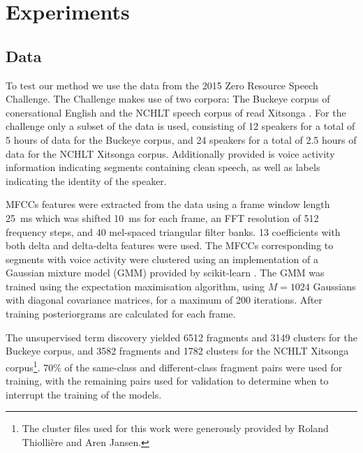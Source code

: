 \section{Experiments}
\label{sec:experiments}

\subsection{Data}
\label{sec:data}

To test our method we use the data from the 2015 Zero Resource Speech Challenge.
The Challenge makes use of two corpora: The Buckeye corpus of conersational English \parencite{buckeyecorpus} and the NCHLT speech corpus of read Xitsonga \parencite{barnard2014nchlt}.
For the challenge only a subset of the data is used, consisting of 12 speakers for a total of 5 hours of data for the Buckeye corpus, and 24 speakers for a total of 2.5 hours of data for the NCHLT Xitsonga corpus.
Additionally provided is voice activity information indicating segments containing clean speech, as well as labels indicating the identity of the speaker.

MFCCs features were extracted from the data using a frame window length \SI{25}{\ms} which was shifted \SI{10}{\ms} for each frame, an FFT resolution of 512 frequency steps, and 40 mel-spaced triangular filter banks.
13 coefficients with both delta and delta-delta features were used.
The MFCCs corresponding to segments with voice activity were clustered using an implementation of a Gaussian mixture model (GMM) provided by scikit-learn \parencite{scikit-learn}.
The GMM was trained using the expectation maximisation algorithm, using $M = 1024$ Gaussians with diagonal covariance matrices, for a maximum of 200 iterations.
After training posteriorgrams are calculated for each frame.

The unsupervised term discovery yielded 6512 fragments and 3149 clusters for the Buckeye corpus, and 3582 fragments and 1782 clusters for the NCHLT Xitsonga corpus\footnote{The cluster files used for this work were generously provided by Roland Thiollière and Aren Jansen.}.
70\% of the same-class and different-class fragment pairs were used for training, with the remaining pairs used for validation to determine when to interrupt the training of the models.



